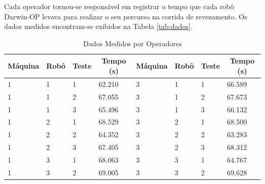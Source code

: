 \documentclass[
12pt,					%
openright,				%
oneside,				%
a4paper,				%
english,
brazil
]{ABNT/abntex2_report}
\begin{document}
Cada operador tornou-se responsável em registrar o tempo que cada robô Darwin-OP levava para realizar o seu percurso na corrida de revezamento. Os dados medidos encontram-se exibidos na Tabela \ref{tab:dados}.

\begin{table}[H]
	\centering
	\caption{Dados Medidos por Operadores}
	\begin{tabular}{llllllll}
	\hline
	\multicolumn{1}{c}{Máquina} & \multicolumn{1}{c}{Robô} & \multicolumn{1}{c}{Teste} & \multicolumn{1}{c}{Tempo (s)} & \multicolumn{1}{c}{Máquina} & \multicolumn{1}{c}{Robô} & \multicolumn{1}{c}{Teste} & \multicolumn{1}{c}{Tempo (s)} \\ \hline
	1                           & 1                        & 1                         & 62.210   & 3                           & 1                        & 1                         & 66.589                        \\
	1                           & 1                        & 2                         & 67.055   & 3                           & 1                        & 2                         & 67.673                       \\
	1                           & 1                        & 3                         & 65.496   & 3                           & 1                        & 3                         & 66.132                     \\
	1                           & 2                        & 1                         & 68.529   & 3                           & 2                        & 1                         & 68.500                        \\
	1                           & 2                        & 2                         & 64.352   & 3                           & 2                        & 2                         & 63.283                        \\
	1                           & 2                        & 3                         & 67.405   & 3                           & 2                        & 3                         & 68.312                       \\
	1                           & 3                        & 1                         & 68.063   & 3                           & 3                        & 1                         & 64.767                        \\
	1                           & 3                        & 2                         & 69.005   & 3                           & 3                        & 2                         & 69.628                        \\

\end{tabular}
\end{table}
\end{document}
